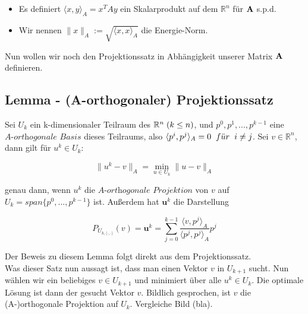 \begin{itemize}
\item Es definiert $\langle x,y \rangle _{A} = x^{T}Ay$ ein Skalarprodukt auf dem $\mathbb{R}^{n}$ für ${\textbf{A}}$ s.p.d.
\item Wir nennen $\|x\|_{A} := \sqrt{\langle x, x \rangle _{A}}$ die Energie-Norm.
\end{itemize}

Nun wollen wir noch den Projektionssatz in Abhängigkeit unserer Matrix ${\textbf{A}}$ definieren.

\subsection{Lemma - (A-orthogonaler) Projektionssatz}\label{s.Projektionssatz}

Sei $U_{k}$ ein k-dimensionaler Teilraum des $\mathbb{R}^{n} \hspace{1mm} (k \le n)$, und $p^{0}, p^{1},...,p^{k-1}$ eine $\textit{A-orthogonale Basis}$ dieses Teilraums, also $\langle p^{i}, p^{j} \rangle _{A} = 0 \hspace{2mm} f\ddot{u}r \hspace{2mm} i \ne j$. Sei $v \in \mathbb{R}^{n}$, dann gilt für $u^{k} \in U_{k}$:

\begin{equation}
\|u^{k} - v\|_{A} = \underset{u \in U_{k}}{\min} \|u - v\|_{A}
\end{equation}

genau dann, wenn $u^{k}$ die $\textit{A-orthogonale Projektion}$ von $v$ auf $U_{k} = span\{p^{0},...,p^{k-1}\}$ ist. Außerdem hat $\textbf{u}^{k}$ die Darstellung

\begin{equation}
P_{U_{k,\langle \cdot,\cdot \rangle}}(v) = \textbf{u}^{k} = \sum_{j=0}^{k-1} \frac {\langle v, p^{j} \rangle _{A}} {\langle p^{j}, p^{j} \rangle _{A}} p^{j}
\end{equation}

Der Beweis zu diesem Lemma folgt direkt aus dem Projektionssatz. \\
Was dieser Satz nun aussagt ist, dass man einen Vektor $v$ in $U_{k+1}$ sucht. Nun wählen wir ein beliebiges $v \in U_{k+1}$ und minimiert über alle $u^{k} \in U_{k}$. Die optimale Lösung ist dann der gesucht Vektor $v$.
Bildlich gesprochen, ist $v$ die (A-)orthogonale Projektion auf $U_{k}$. Vergleiche Bild (bla). \\ \\

